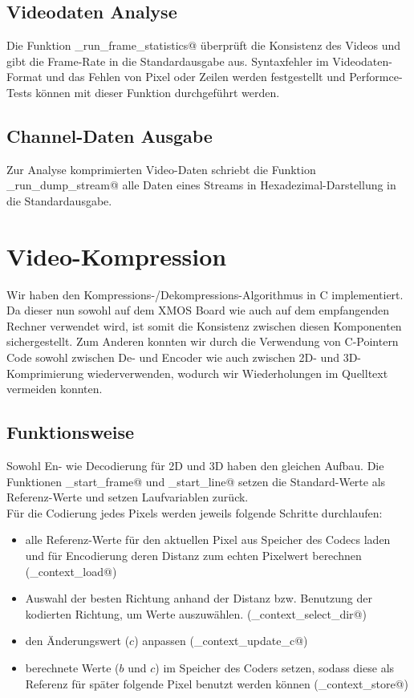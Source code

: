 \subsection{Videodaten Analyse}
Die Funktion \lstinline@tst_run_frame_statistics@ überprüft die Konsistenz des
Videos und gibt die Frame-Rate in die Standardausgabe aus.
Syntaxfehler im Videodaten-Format und das Fehlen von Pixel oder Zeilen 
werden festgestellt und Performce-Tests können mit dieser Funktion durchgeführt
werden.

\subsection{Channel-Daten Ausgabe}
Zur Analyse komprimierten Video-Daten schriebt die Funktion 
\lstinline@tst_run_dump_stream@ alle Daten eines Streams in
Hexadezimal-Darstellung in die Standardausgabe.


\section{Video-Kompression}

Wir haben den Kompressions-/Dekompressions-Algorithmus in C implementiert.
Da dieser nun sowohl auf dem XMOS Board wie auch auf dem empfangenden Rechner 
verwendet wird, ist somit die Konsistenz zwischen diesen Komponenten sichergestellt.
Zum Anderen konnten wir durch die Verwendung von C-Pointern Code sowohl zwischen 
De- und Encoder wie auch zwischen 2D- und 3D-Komprimierung wiederverwenden,
wodurch wir Wiederholungen im Quelltext vermeiden konnten.

\subsection{Funktionsweise}
Sowohl En- wie Decodierung für 2D und 3D haben den gleichen Aufbau.
Die Funktionen \lstinline@cmpr_start_frame@ und \lstinline@cmpr_start_line@
setzen die Standard-Werte als Referenz-Werte und setzen Laufvariablen zurück.
\\
Für die Codierung jedes Pixels werden jeweils folgende Schritte durchlaufen:
\begin{itemize}
\item alle Referenz-Werte für den aktuellen Pixel aus Speicher des Codecs laden 
      und für Encodierung deren Distanz zum echten Pixelwert berechnen
	(\lstinline@cmpr_context_load@)
\item Auswahl der besten Richtung anhand der Distanz bzw. Benutzung
      der kodierten Richtung, um Werte auszuwählen.
	(\lstinline@cmpr_context_select_dir@)
\item den Änderungswert ($c$) anpassen
	(\lstinline@cmpr_context_update_c@)
\item berechnete Werte ($b$ und $c$) im Speicher des Coders setzen, sodass diese 
      als Referenz für später folgende Pixel benutzt werden können
	(\lstinline@cmpr_context_store@)
\end{itemize}

